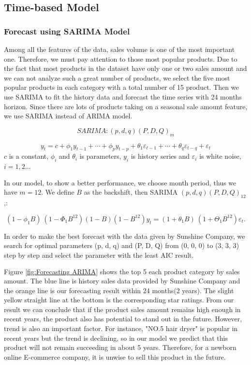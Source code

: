 \documentclass[12pt]{article}  %
\begin{document}
\subsection{Time-based Model}

\subsubsection{Forecast using SARIMA Model}
 Among all the features of the data, sales volume is one of the most important one. Therefore, we must pay attention to those most popular products. Due to the fact that most products in the dataset have only one or two sales amount and we can not analyze such a great number of products, we select the five most popular products in each category with a total number of 15 product. Then we use SARIMA to fit the history data and forecast the time series with 24 months horizon. Since there are lots of products taking on a seasonal sale amount feature, we use SARIMA instead of ARIMA model.\cite{3}
 
\begin{equation}
SARIMA : (p, d, q) (P, D, Q)_m
\end{equation}


\begin{equation}
y_{t} = c + \phi_{1}y_{t-1} + \cdots + \phi_{p}y_{t-p}
       + \theta_{1}\varepsilon_{t-1} + \cdots + \theta_{q}\varepsilon_{t-q} + \varepsilon_{t}
\end{equation}
$c$ is a constant, $\phi_i$ and $\theta_i$ is parameters, $y_i$ is history series and $\varepsilon_i$ is white noise, $i={1,2...}$  

  In our model, to show a better performance, we choose month period, thus we have $m=12$. We define $B$ as the backshift, then SARIMA $(p, d, q) (P, D, Q)_{12}$,:

  $$
  (1 - \phi_{1}B)~(1 - \Phi_{1}B^{12}) (1 - B) (1 - B^{12})y_{t} =  (1 + \theta_{1}B)~ (1 + \Theta_{1}B^{12})\varepsilon_{t}.
  $$

In order to make the best forecast with the data given by Sunshine Company, we search for optimal parameters (p, d, q) and (P, D, Q) from (0, 0, 0) to (3, 3, 3) step by step and select the parameter with the least AIC result. 

Figure \ref{fig:Forecasting ARIMA} shows the top 5 each product category by sales amount. The blue line is history sales data provided by Sunshine Company and the orange line is our forecasting result within 24 months(2 years). The slight yellow straight line at the bottom is the corresponding star ratings. From our result we can conclude that if the product sales amount remains high enough in recent years, the product also has potential to stand out in the future. However, trend is also an important factor. For instance, "NO.5 hair dryer" is popular in recent years but the trend is declining, so in our model we predict that this product will not remain succeeding in about 5 years. Therefore, for a newborn online E-commerce company, it is unwise to sell this product in the future. 
\end{document}
